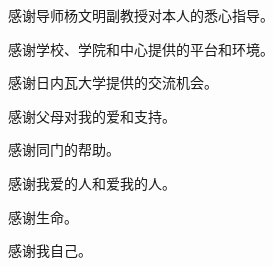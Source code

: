 
\begin{acknowledgements}
  感谢导师杨文明副教授对本人的悉心指导。

  感谢学校、学院和中心提供的平台和环境。

  感谢日内瓦大学提供的交流机会。

  感谢父母对我的爱和支持。

  感谢同门的帮助。

  感谢我爱的人和爱我的人。

  感谢生命。

  感谢我自己。



\end{acknowledgements}
